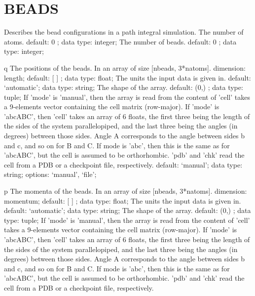 \section{BEADS}
\label{BEADS}
\begin{ipifield}{}%
{Describes the bead configurations in a path integral simulation.}%
{}%
{%
{The number of atoms.}%
{default:  0 ; data type: integer; }%
%
{The number of beads.}%
{default:  0 ; data type: integer; }%
}
\begin{ipifield}{q}%
{The positions of the beads. In an array of size [nbeads, 3*natoms].}%
{dimension: length; default:  [ ] ; data type: float; }%
{%
{The units the input data is given in.}%
{default: `automatic'; data type: string; }%
%
{The shape of the array.}%
{default:  (0,) ; data type: tuple; }%
%
{If 'mode' is 'manual', then the array is read from the content of 'cell' takes a 9-elements vector containing the cell matrix (row-major). If 'mode' is 'abcABC', then 'cell' takes an array of 6 floats, the first three being the length of the sides of the system parallelopiped, and the last three being the angles (in degrees) between those sides. Angle A corresponds to the angle between sides b and c, and so on for B and C. If mode is 'abc', then this is the same as for 'abcABC', but the cell is assumed to be orthorhombic. 'pdb' and 'chk' read the cell from a PDB or a checkpoint file, respectively.}%
{default: `manual'; data type: string; options: `manual', `file'; }%
}
\end{ipifield}
\begin{ipifield}{p}%
{The momenta of the beads. In an array of size [nbeads, 3*natoms].}%
{dimension: momentum; default:  [ ] ; data type: float; }%
{%
{The units the input data is given in.}%
{default: `automatic'; data type: string; }%
%
{The shape of the array.}%
{default:  (0,) ; data type: tuple; }%
%
{If 'mode' is 'manual', then the array is read from the content of 'cell' takes a 9-elements vector containing the cell matrix (row-major). If 'mode' is 'abcABC', then 'cell' takes an array of 6 floats, the first three being the length of the sides of the system parallelopiped, and the last three being the angles (in degrees) between those sides. Angle A corresponds to the angle between sides b and c, and so on for B and C. If mode is 'abc', then this is the same as for 'abcABC', but the cell is assumed to be orthorhombic. 'pdb' and 'chk' read the cell from a PDB or a checkpoint file, respectively.}%
}
\end{ipifield}
\end{ipifield}
